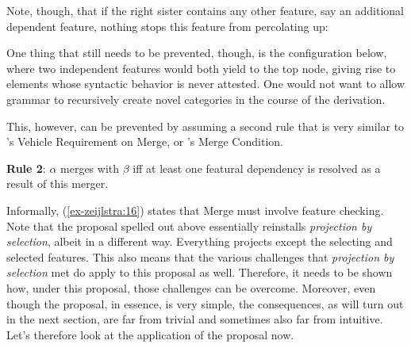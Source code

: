 \documentclass[output=paper
,modfonts
,nonflat]{langsci/langscibook}
\begin{document}
\begin{figure}[!h]
	\begin{exe}
		\exbox{ \label{ex-zeijlstra:13}
		\begin{forest}	
			[\{{[}F{]}\}
			[\{{[}F{]}{,} {[}uG{]}\}]
			[\{{[}G{]}\}] ]
		\end{forest}}
	\end{exe} \vspace{-0.7cm}
\end{figure}
\noindent Note, though, that if the right sister contains any other feature, say an additional dependent feature, nothing stops this feature from percolating up:

\begin{figure}[!h]
	\begin{exe}
		\exbox{
		\begin{forest}	
			[\{{[}F{]}{,} {[}uK{]}\}
			[\{{[}F{]}{,} {[}uG{]}\}]
			[\{{[}G{]}{,} {[}uK{]}\}] ]
		\end{forest}}
	\end{exe} \vspace{-0.9cm}
\end{figure}
\newpage\noindent One thing that still needs to be prevented, though, is the configuration below, where two independent features would both yield to the top node, giving rise to elements whose syntactic behavior is never attested. One would not want to allow grammar to recursively create novel categories in the course of the derivation.
\begin{figure}[!h]
	\begin{exe}
		\exbox{
		\begin{forest}	
			[*\{{[}F{]}{,} {[}G{]}\}
			[\{{[}F{]}\}]
			[\{{[}G{]}\}] ]
		\end{forest}}
	\end{exe} \vspace{-0.8cm}
\end{figure}
\newline \noindent This, however, can be prevented by assuming a second rule that is very similar to \citet{Pesetsky_Torrego2006}'s Vehicle Requirement on Merge, or \citet{Wurmbrand2014}'s Merge Condition.

\begin{exe}
\ex \label{ex-zeijlstra:16} \textbf{Rule 2}: $\alpha$ merges with $\beta$ iff at least one featural dependency is resolved as a result of this merger.
\end{exe}
Informally, (\ref{ex-zeijlstra:16}) states that Merge must involve feature checking. Note that the proposal spelled out above essentially reinstalls \textit{projection by selection}, albeit in a different way. Everything projects except the selecting and selected features. This also means that the various challenges that \textit{projection by selection} met do apply to this proposal as well. Therefore, it needs to be shown how, under this proposal, those challenges can be overcome. Moreover, even though the proposal, in essence, is very simple, the consequences, as will turn out in the next section, are far from trivial and sometimes also far from intuitive. Let’s therefore look at the application of the proposal now.
\end{document}
